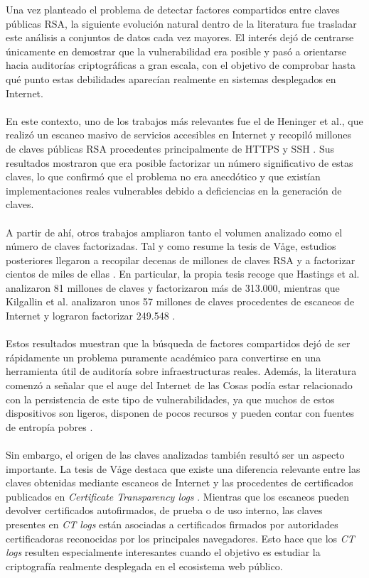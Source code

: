 Una vez planteado el problema de detectar factores compartidos entre claves públicas RSA, la siguiente evolución natural dentro de la literatura fue trasladar este análisis a conjuntos de datos cada vez mayores. El interés dejó de centrarse únicamente en demostrar que la vulnerabilidad era posible y pasó a orientarse hacia auditorías criptográficas a gran escala, con el objetivo de comprobar hasta qué punto estas debilidades aparecían realmente en sistemas desplegados en Internet.
\\
\\
En este contexto, uno de los trabajos más relevantes fue el de Heninger et al., que realizó un escaneo masivo de servicios accesibles en Internet y recopiló millones de claves públicas RSA procedentes principalmente de HTTPS y SSH \cite{heninger2012mining}. Sus resultados mostraron que era posible factorizar un número significativo de estas claves, lo que confirmó que el problema no era anecdótico y que existían implementaciones reales vulnerables debido a deficiencias en la generación de claves.
\\
\\
A partir de ahí, otros trabajos ampliaron tanto el volumen analizado como el número de claves factorizadas. Tal y como resume la tesis de Våge, estudios posteriores llegaron a recopilar decenas de millones de claves RSA y a factorizar cientos de miles de ellas \cite{vage2022finding}. En particular, la propia tesis recoge que Hastings et al. analizaron 81 millones de claves y factorizaron más de 313.000, mientras que Kilgallin et al. analizaron unos 57 millones de claves procedentes de escaneos de Internet y lograron factorizar 249.548 \cite{vage2022finding}.
\\
\\
Estos resultados muestran que la búsqueda de factores compartidos dejó de ser rápidamente un problema puramente académico para convertirse en una herramienta útil de auditoría sobre infraestructuras reales. Además, la literatura comenzó a señalar que el auge del Internet de las Cosas podía estar relacionado con la persistencia de este tipo de vulnerabilidades, ya que muchos de estos dispositivos son ligeros, disponen de pocos recursos y pueden contar con fuentes de entropía pobres \cite{vage2022finding}.
\\
\\
Sin embargo, el origen de las claves analizadas también resultó ser un aspecto importante. La tesis de Våge destaca que existe una diferencia relevante entre las claves obtenidas mediante escaneos de Internet y las procedentes de certificados publicados en \textit{Certificate Transparency logs} \cite{vage2022finding}. Mientras que los escaneos pueden devolver certificados autofirmados, de prueba o de uso interno, las claves presentes en \textit{CT logs} están asociadas a certificados firmados por autoridades certificadoras reconocidas por los principales navegadores. Esto hace que los \textit{CT logs} resulten especialmente interesantes cuando el objetivo es estudiar la criptografía realmente desplegada en el ecosistema web público.
